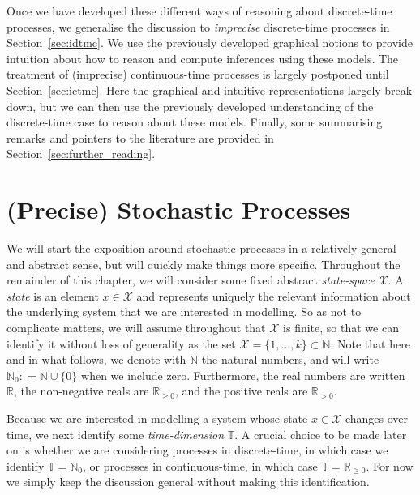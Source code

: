 \documentclass[graybox]{svmult}
\newcommand{\nats}{\mathbb{N}}
\newcommand{\natswith}{\nats_{0}}
\newcommand{\reals}{\mathbb{R}}
\newcommand{\realspos}{\reals_{>0}}
\newcommand{\realsnonneg}{\reals_{\geq 0}}
\newcommand{\states}{\mathcal{X}}
\newcommand{\coloneqq}{:\!=}
\newcommand{\timedim}{\mathbb{T}}
\begin{document}
Once we have developed these different ways of reasoning about discrete-time processes, we generalise the discussion to \emph{imprecise} discrete-time processes in Section~\ref{sec:idtmc}. We use the previously developed graphical notions to provide intuition about how to reason and compute inferences using these models. The treatment of (imprecise) continuous-time processes is largely postponed until Section~\ref{sec:ictmc}. Here the graphical and intuitive representations largely break down, but we can then use the previously developed understanding of the discrete-time case to reason about these models. Finally, some summarising remarks and pointers to the literature are provided in Section~\ref{sec:further_reading}.

\section{(Precise) Stochastic Processes}\label{sec:prec_stoch_proc}


We will start the exposition around stochastic processes in a relatively general and abstract sense, but will quickly make things more specific. Throughout the remainder of this chapter, we will consider some fixed abstract \emph{state-space} $\states$. A \emph{state} is an element $x\in\states$ and represents uniquely the relevant information about the underlying system that we are interested in modelling. So as not to complicate matters, we will assume throughout that $\states$ is finite, so that we can identify it without loss of generality as the set $\states=\{1,\ldots,k\}\subset\nats$. Note that here and in what follows, we denote with $\nats$ the natural numbers, and will write $\natswith\coloneqq\nats\cup\{0\}$ when we include zero. Furthermore, the real numbers are written $\reals$, the non-negative reals are $\realsnonneg$, and the positive reals are $\realspos$.

Because we are interested in modelling a system whose state $x\in\states$ changes over time, we next identify some \emph{time-dimension} $\timedim$. A crucial choice to be made later on is whether we are considering processes in discrete-time, in which case we identify $\timedim=\natswith$, or processes in continuous-time, in which case $\timedim=\realsnonneg$. For now we simply keep the discussion general without making this identification.
\end{document}
